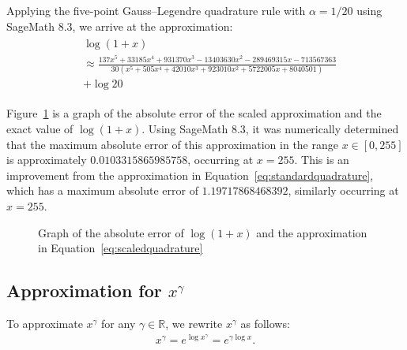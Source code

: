 Applying the five-point Gauss--Legendre quadrature rule with $\alpha = 1/20$ using SageMath 8.3, we arrive at the approximation:
\begin{align}\label{eq:scaledquadrature}
  \begin{split}
    &\log(1+x) \\
    &\approx \frac{137x^5 + 33185x^4 + 931370x^3 - 13403630x^2 - 289469315x - 713567363}
    {30(x^5 + 505x^4 + 42010x^3 + 923010x^2 + 5722005x + 8040501)} \\
    &+ \log{20}
  \end{split}
\end{align}

Figure~\ref{fig:scaledquadrature} is a graph of the absolute error of the scaled approximation and the exact value of $\log{(1+x)}$. Using SageMath 8.3, it was numerically determined that the maximum absolute error of this approximation in the range $x\in[0,255]$ is approximately $0.0103315865985758$, occurring at $x=255$. This is an improvement from the approximation in Equation~\ref{eq:standardquadrature}, which has a maximum absolute error of $1.19717868468392$, similarly occurring at $x=255$.

\begin{figure}[h]
    \centering
    \caption{Graph of the absolute error of $\log{(1+x)}$ and the approximation in Equation~\ref{eq:scaledquadrature}}
    \label{fig:scaledquadrature}
\end{figure}

\subsection{Approximation for $x^\gamma$}
\label{sec:approx-pwr}
To approximate $x^\gamma$ for any $\gamma \in \mathbb{R}$, we rewrite $x^\gamma$ as follows:
\begin{align*}
  x^\gamma = e^{\log{x^\gamma}} = e^{\gamma\log{x}}.
\end{align*}

